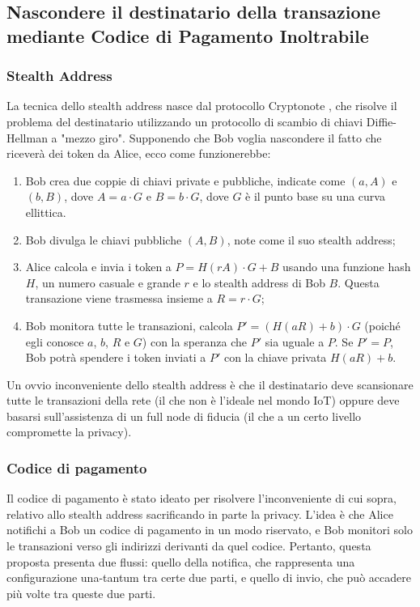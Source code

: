 \subsection{Nascondere il destinatario della transazione mediante Codice di Pagamento Inoltrabile}

\subsubsection{Stealth Address}
La tecnica dello stealth address nasce dal protocollo Cryptonote \cite{c28}, che risolve il problema del destinatario utilizzando un protocollo di scambio di chiavi Diffie-Hellman a "mezzo giro". Supponendo che Bob voglia nascondere il fatto che riceverà dei token da Alice, ecco come funzionerebbe:

\begin{enumerate}
	\item Bob crea due coppie di chiavi private e pubbliche, indicate come $(a, A)$ e $(b, B)$, dove $A = a\cdot G$ e $B = b\cdot G$, dove $G$ è il punto base su una curva ellittica.

	\item Bob divulga le chiavi pubbliche $(A, B)$, note come il suo stealth address;

	\item Alice calcola e invia i token a $P = H (rA)\cdot G + B$ usando una funzione hash $H$, un numero casuale e grande $r$  e lo stealth address di Bob $B$. Questa transazione viene trasmessa insieme a $R = r\cdot G$;
	\item  Bob monitora tutte le transazioni, calcola $P' = (H(aR) + b)\cdot G$ (poiché egli conosce $a$, $b$, $R$ e $G$) con la speranza che $P'$ sia uguale a $P$. Se $P' = P$, Bob potrà spendere i token inviati a $P'$ con la chiave privata $H(aR) + b$.
\end{enumerate}

Un ovvio inconveniente dello stealth address è che il destinatario deve scansionare tutte le transazioni della rete (il che non è l'ideale nel mondo IoT) oppure deve basarsi sull'assistenza di un full node di fiducia (il che a un certo livello compromette la privacy).

\subsubsection{Codice di pagamento}
Il codice di pagamento è stato ideato per risolvere l'inconveniente di cui sopra, relativo allo stealth address sacrificando in parte la privacy. L'idea è che Alice notifichi a Bob un codice di pagamento in un modo riservato, e Bob monitori solo le transazioni verso gli indirizzi derivanti da quel codice. Pertanto, questa proposta presenta due flussi: quello della notifica, che rappresenta una configurazione una-tantum tra certe due parti, e quello di invio, che può accadere più volte tra queste due parti.

